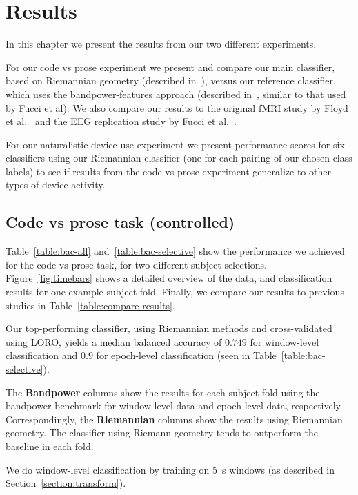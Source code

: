 \chapter{Results}\label{section:results}

    In this chapter we present the results from our two different experiments.

    For our code vs prose experiment we present and compare our main classifier, based on Riemannian geometry (described in~), versus our reference classifier, which uses the bandpower-features approach (described in~, similar to that used by Fucci et al). We also compare our results to the original fMRI study by Floyd et al.~\cite{floyd_decoding_2017} and the EEG replication study by Fucci et al.~\cite{fucci_replication_2019}. 

    For our naturalistic device use experiment we present performance scores for six classifiers using our Riemannian classifier (one for each pairing of our chosen class labels) to see if results from the code vs prose experiment generalize to other types of device activity.

    \pagebreak
    \section{Code vs prose task (controlled)}
        Table~\ref{table:bac-all} and~\ref{table:bac-selective} show the performance we achieved for the code vs prose task, for two different subject selections. Figure~\ref{fig:timebars} shows a detailed overview of the data, and classification results for one example subject-fold. Finally, we compare our results to previous studies in Table~\ref{table:compare-results}.

        

        Our top-performing classifier, using Riemannian methods and cross-validated using LORO, yields a median balanced accuracy of $0.749$  for window-level classification and $0.9$ for epoch-level classification (seen in Table~\ref{table:bac-selective}).

        The \textbf{Bandpower} columns show the results for each subject-fold using the bandpower benchmark for window-level data and epoch-level data, respectively. Correspondingly, the \textbf{Riemannian} columns show the results using Riemannian geometry. The classifier using Riemann geometry tends to outperform the baseline in each fold.

        We do window-level classification by training on \SI{5}{\second} windows (as described in Section~\ref{section:transform}).

